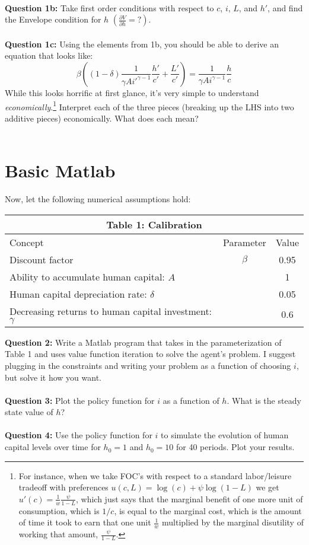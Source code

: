 \documentclass[11pt]{article}
\begin{document}
\ \\
\textbf{Question 1b:} Take first order conditions with respect to $c$, $i$, $L$, and $h'$, and find the Envelope condition for $h$ $\left(\frac{\partial V}{\partial h}=?\right)$.\\
 \ \\

\textbf{Question 1c:} Using the elements from 1b, you should be able to derive an equation that looks like: $$\beta \left((1-\delta)\frac{1}{\gamma A i'^{\gamma-1}}\frac{h'}{c'}+\frac{L'}{c'}\right)=\frac{1}{\gamma A i^{\gamma-1}}\frac{h}{c}$$
While this looks horrific at first glance, it's very simple to understand \emph{economically}.\footnote{For instance, when we take FOC's with respect to a standard labor/leisure tradeoff with preferences $u(c,L)=\log(c)+\psi\log(1-L)$ we get $u'(c)=\frac{1}{w}\frac{\psi}{1-L}$, which just says that the marginal benefit of one more unit of consumption, which is $1/c$, is equal to the marginal cost, which is the amount of time it took to earn that one unit $\frac{1}{w}$ multiplied by the marginal disutility of working that amount, $\frac{\psi}{1-L}$.}  Interpret each of the three pieces (breaking up the LHS into two additive pieces) economically. What does each mean?\\
 \ \\

\clearpage
\section{Basic Matlab}
Now, let the following numerical assumptions hold:
\begin{table}[ht!]
\centering
\begin{tabular}{lcc}
\hline
\hline
\multicolumn{3}{c}{Table 1: Calibration}\\
\hline
Concept & Parameter & Value \\ 
Discount factor & $\beta$ & 0.95\\
Ability to accumulate human capital: $A$ &  & 1\\
Human capital depreciation rate: $\delta$ &  & 0.05\\
Decreasing returns to human capital investment: $\gamma$ &  & 0.6\\
\hline
\hline
\end{tabular}
\end{table}

\textbf{Question 2:} Write a Matlab program that takes in the parameterization of Table 1 and uses value function iteration to solve the agent's problem.  I suggest plugging in the constraints and writing your problem as a function of choosing $i$, but solve it how you want.\\
\ \\

\textbf{Question 3:} Plot the policy function for $i$ as a function of $h$.  What is the steady state value of $h$?\\
\ \\

\textbf{Question 4:} Use the policy function for $i$ to simulate the evolution of human capital levels over time for $h_0=1$ and $h_0=10$ for 40 periods.  Plot your results.\\
\end{document}
